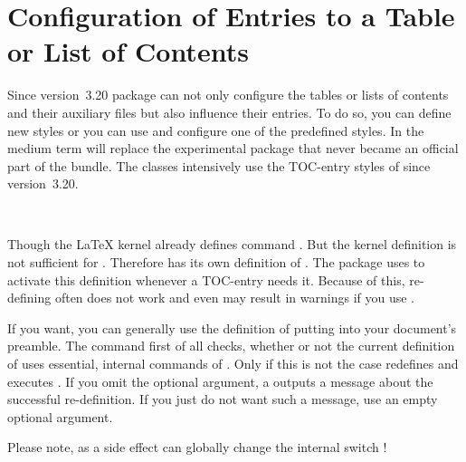 \section{Configuration of Entries to a Table or List of Contents}
%
%

Since version~3.20 package
 can not only configure the tables or lists of contents and
their auxiliary files but also influence their entries. To do so, you can
define new styles or you can use and configure one of the predefined
styles. In the medium term  will replace the experimental
package  that never became an official part of the
\KOMAScript{} bundle. The \KOMAScript{} classes intensively use the TOC-entry
styles of  since version~3.20.

\begin{Declaration}
  \\
\end{Declaration}
%
%
Though the \LaTeX{} kernel
already defines command . But the kernel definition is not
sufficient for . Therefore  has its own
definition of . The package uses
 to activate this definition whenever a TOC-entry
needs it. Because of this, re-defining  often does not work
and even may result in warnings if you use .

If you want, you can generally use the definition of 
putting  into your document's preamble. The
command first of all checks, whether or not the current definition of
 uses essential, internal commands of
. Only if this is not the case 
redefines  and executes . If you omit the
optional argument, a  outputs a message about the
successful re-definition. If you just do not want such a message, use an empty
optional argument.

Please note, as a side effect
 can globally change the internal switch
!%
%
%


